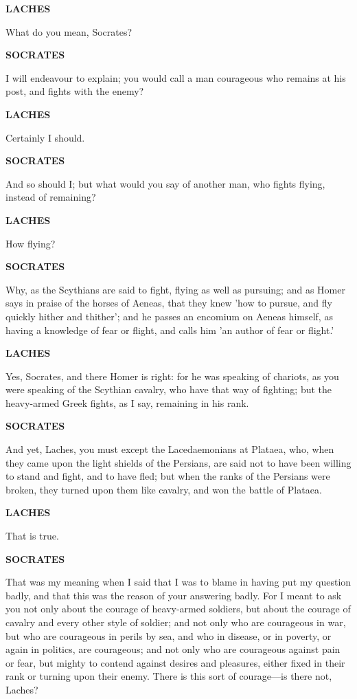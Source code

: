 \documentclass[11pt,letter]{article}
\begin{document}
\par \textbf{LACHES}
\par   What do you mean, Socrates?

\par \textbf{SOCRATES}
\par   I will endeavour to explain; you would call a man courageous who remains at his post, and fights with the enemy?

\par \textbf{LACHES}
\par   Certainly I should.

\par \textbf{SOCRATES}
\par   And so should I; but what would you say of another man, who fights flying, instead of remaining?

\par \textbf{LACHES}
\par   How flying?

\par \textbf{SOCRATES}
\par   Why, as the Scythians are said to fight, flying as well as pursuing; and as Homer says in praise of the horses of Aeneas, that they knew 'how to pursue, and fly quickly hither and thither'; and he passes an encomium on Aeneas himself, as having a knowledge of fear or flight, and calls him 'an author of fear or flight.'

\par \textbf{LACHES}
\par   Yes, Socrates, and there Homer is right:  for he was speaking of chariots, as you were speaking of the Scythian cavalry, who have that way of fighting; but the heavy-armed Greek fights, as I say, remaining in his rank.

\par \textbf{SOCRATES}
\par   And yet, Laches, you must except the Lacedaemonians at Plataea, who, when they came upon the light shields of the Persians, are said not to have been willing to stand and fight, and to have fled; but when the ranks of the Persians were broken, they turned upon them like cavalry, and won the battle of Plataea.

\par \textbf{LACHES}
\par   That is true.

\par \textbf{SOCRATES}
\par   That was my meaning when I said that I was to blame in having put my question badly, and that this was the reason of your answering badly. For I meant to ask you not only about the courage of heavy-armed soldiers, but about the courage of cavalry and every other style of soldier; and not only who are courageous in war, but who are courageous in perils by sea, and who in disease, or in poverty, or again in politics, are courageous; and not only who are courageous against pain or fear, but mighty to contend against desires and pleasures, either fixed in their rank or turning upon their enemy. There is this sort of courage—is there not, Laches?
\end{document}
